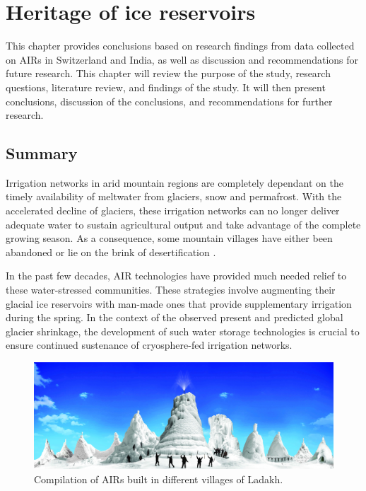 \chapter{Heritage of ice reservoirs}


This chapter provides conclusions based on research findings from data collected on AIRs in Switzerland and India,
as well as discussion and recommendations for future research. This chapter will review the purpose of the
study, research questions, literature review, and findings of the study. It will then present conclusions,
discussion of the conclusions, and recommendations for further research.

\section{Summary}

Irrigation networks in arid mountain regions are completely dependant on the timely availability of meltwater
from glaciers, snow and permafrost. With the accelerated decline of glaciers, these irrigation networks can no
longer deliver adequate water to sustain agricultural output and take advantage of the complete growing season.
As a consequence, some mountain villages have either been abandoned or lie on the brink of desertification
\citep{grossmanHimalayanGlaciersMelt2015}.

In the past few decades, AIR technologies have provided much needed relief to these
water-stressed communities. These strategies involve augmenting their glacial ice reservoirs with
man-made ones that provide supplementary irrigation during the spring. In the context of the observed present
and predicted global glacier shrinkage, the development of such water storage technologies is crucial to ensure
continued sustenance of cryosphere-fed irrigation networks.

\begin{figure}[htb]
	\includegraphics[width=\textwidth]{figs/AIRs_Ladakh}
	\caption{Compilation of AIRs built in different villages of Ladakh.}
	\label{fig:airs_ladakh}
\end{figure}

